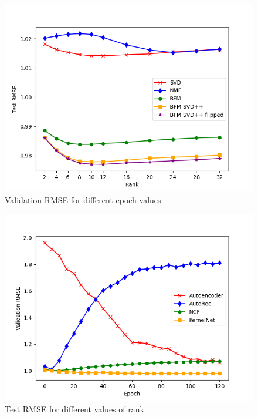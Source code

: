 \documentclass[10pt,conference,compsocconf]{IEEEtran}
\begin{document}
    \begin{figure}
        \includegraphics[width=\columnwidth]{figures/rank.png}
        \caption{Validation RMSE for different epoch values}
        \label{fig:rank}
    \end{figure}

    \begin{figure}
        \includegraphics[width=\columnwidth]{figures/validation_plot.png}
        \caption{Test RMSE for different values of rank}
        \label{fig:validation}
    \end{figure}
    
    
\end{document}
